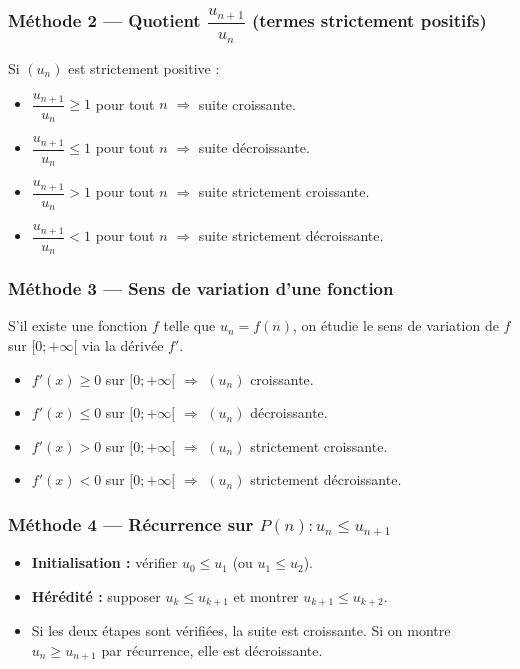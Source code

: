 \documentclass[11pt,a4paper,openany]{book}
\theoremstyle{definition}
\begin{document}
    \subsubsection{Méthode 2 — Quotient $\dfrac{u_{n+1}}{u_n}$ (termes strictement positifs)}
    Si $(u_n)$ est strictement positive :
    \begin{itemize}
        \item $\dfrac{u_{n+1}}{u_n} \geq 1$ pour tout $n$ $\Rightarrow$ suite croissante.
        \item $\dfrac{u_{n+1}}{u_n} \leq 1$ pour tout $n$ $\Rightarrow$ suite décroissante.
        \item $\dfrac{u_{n+1}}{u_n} > 1$ pour tout $n$ $\Rightarrow$ suite strictement croissante.
        \item $\dfrac{u_{n+1}}{u_n} < 1$ pour tout $n$ $\Rightarrow$ suite strictement décroissante.
    \end{itemize}

    \subsubsection{Méthode 3 — Sens de variation d'une fonction}
    S'il existe une fonction $f$ telle que $u_n=f(n)$, on étudie le sens de variation de $f$
    sur $[0;+\infty[$ via la dérivée $f'$.
    \begin{itemize}
        \item $f'(x) \geq 0$ sur $[0;+\infty[$ $\Rightarrow$ $(u_n)$ croissante.
        \item $f'(x) \leq 0$ sur $[0;+\infty[$ $\Rightarrow$ $(u_n)$ décroissante.
        \item $f'(x) > 0$ sur $[0;+\infty[$ $\Rightarrow$ $(u_n)$ strictement croissante.
        \item $f'(x) < 0$ sur $[0;+\infty[$ $\Rightarrow$ $(u_n)$ strictement décroissante.
    \end{itemize}

    \subsubsection{Méthode 4 — Récurrence sur $P(n) : u_n \leq u_{n+1}$}
    \begin{itemize}
        \item \textbf{Initialisation :} vérifier $u_0 \leq u_1$ (ou $u_1 \leq u_2$).
        \item \textbf{Hérédité :} supposer $u_k \leq u_{k+1}$ et montrer $u_{k+1} \leq u_{k+2}$.
        \item Si les deux étapes sont vérifiées, la suite est croissante.
              Si on montre $u_n \geq u_{n+1}$ par récurrence, elle est décroissante.
    \end{itemize}
\end{document}
